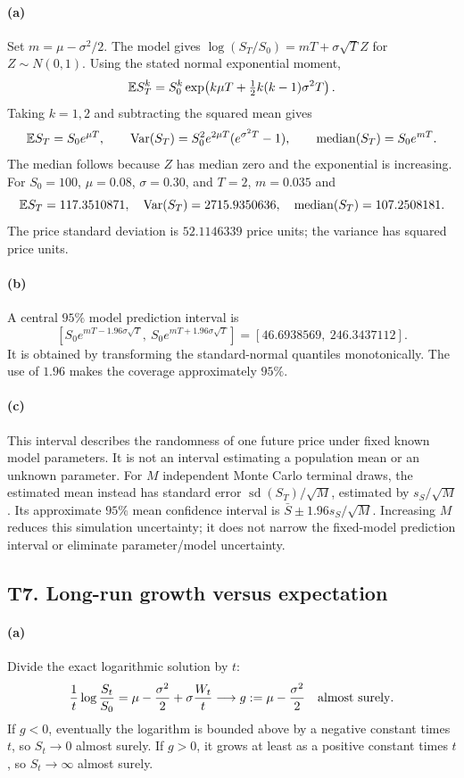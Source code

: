 \paragraph{(a)} Set $m=\mu-\sigma^2/2$. The model gives $\log(S_T/S_0)=mT+\sigma\sqrt T Z$ for $Z\sim N(0,1)$. Using the stated normal exponential moment,
\[
 \mathbb E S_T^k=S_0^k\exp\!\left(k\mu T+\tfrac12k(k-1)\sigma^2T\right).
\]
Taking $k=1,2$ and subtracting the squared mean gives
\[
 \mathbb E S_T=S_0e^{\mu T},\qquad
 \operatorname{Var}(S_T)=S_0^2e^{2\mu T}(e^{\sigma^2T}-1),\qquad
 \operatorname{median}(S_T)=S_0e^{mT}.
\]
The median follows because $Z$ has median zero and the exponential is increasing. For $S_0=100$, $\mu=0.08$, $\sigma=0.30$, and $T=2$, $m=0.035$ and
\[
 \mathbb E S_T=117.3510871,\quad \operatorname{Var}(S_T)=2715.9350636,
 \quad \operatorname{median}(S_T)=107.2508181.
\]
The price standard deviation is $52.1146339$ price units; the variance has squared price units.
\paragraph{(b)} A central $95\%$ model prediction interval is
\[
 \left[S_0e^{mT-1.96\sigma\sqrt T},\ S_0e^{mT+1.96\sigma\sqrt T}\right]
 =[46.6938569,\ 246.3437112].
\]
It is obtained by transforming the standard-normal quantiles monotonically. The use of $1.96$ makes the coverage approximately $95\%$.
\paragraph{(c)} This interval describes the randomness of one future price under fixed known model parameters. It is not an interval estimating a population mean or an unknown parameter. For $M$ independent Monte Carlo terminal draws, the estimated mean instead has standard error $\operatorname{sd}(S_T)/\sqrt M$, estimated by $s_{S}/\sqrt M$. Its approximate $95\%$ mean confidence interval is $\bar S\pm1.96s_S/\sqrt M$. Increasing $M$ reduces this simulation uncertainty; it does not narrow the fixed-model prediction interval or eliminate parameter/model uncertainty.

\subsection{T7. Long-run growth versus expectation}
\paragraph{(a)} Divide the exact logarithmic solution by $t$:
\[
 \frac1t\log\frac{S_t}{S_0}
 =\mu-\frac{\sigma^2}{2}+\sigma\frac{W_t}{t}
 \longrightarrow g:=\mu-\frac{\sigma^2}{2}\quad\hbox{almost surely}.
\]
If $g<0$, eventually the logarithm is bounded above by a negative constant times $t$, so $S_t\to0$ almost surely. If $g>0$, it grows at least as a positive constant times $t$, so $S_t\to\infty$ almost surely.
